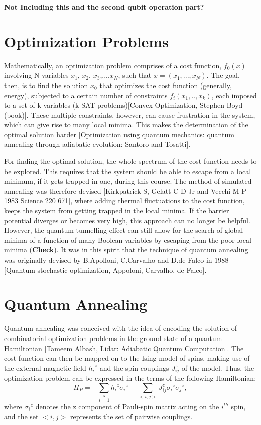 \documentclass[12]{article}
\begin{document}
\textbf{Not Including this and the second qubit operation part?}
\section{Optimization Problems}
Mathematically, an optimization problem comprises of a cost function, $f_0(x)$ involving N variables $x_1$, $x_2$, $x_3$,...,$x_N$, such that $x=(x_1,...,x_N)$. The goal, then, is to find the solution $x_0$ that optimizes the cost function (generally, energy), subjected to a certain number of constraints $f_i(x_1,..,x_k)$, each imposed to a set of k variables (k-SAT problems)[Convex Optimization, Stephen Boyd (book)]. These multiple constraints, however, can cause frustration in the system, which can give rise to many local minima. This makes the determination of the optimal solution harder [Optimization using quantum mechanics: quantum annealing through adiabatic evolution: Santoro and Tosatti].

For finding the optimal solution, the whole spectrum of the cost function needs to be explored. This requires that the system should be able to escape from a local minimum, if it gets trapped in one, during this course. The method of simulated annealing was therefore devised [Kirkpatrick S, Gelatt C D Jr and Vecchi M P 1983 Science 220 671], where adding thermal fluctuations to the cost function, keeps the system from getting trapped in the local minima. If the barrier potential diverges or becomes very high, this approach can no longer be helpful. However, the quantum tunnelling effect can still allow for the search of global minima of a function of many Boolean variables by escaping from the poor local minima (\textbf{Check}). It was in this spirit that the technique of quantum annealing was originally devised by B.Apolloni, C.Carvalho and D.de Falco in 1988 [Quantum stochastic optimization, Appoloni, Carvalho, de Falco].
\section{Quantum Annealing}
Quantum annealing was conceived with the idea of encoding the solution of combinatorial optimization problems in the ground state of a quantum Hamiltonian [Tameem Albash, Lidar: Adiabatic Quantum Computation]. 
The cost function can then be mapped on to the Ising model of spins, making use of the external magnetic field ${h_i}^z$ and the spin couplings ${J_{ij}^z}$ of the model. Thus, the optimization problem can be expressed in the terms of the following Hamiltonian:
\begin{equation}
H_P=-\sum\limits_{i=1}\limits^{N}{h_i}^z{\sigma_i}^z - \sum\limits_{<i,j>}{J_{ij}^z} {\sigma_i}^z{\sigma_j}^z, \label{eq:b4}
\end{equation}
where ${\sigma_i}^z$ denotes the z component of Pauli-spin matrix acting on the $i^{th}$ spin, and the set $<i,j>$ represents the set of pairwise couplings.
\end{document}
